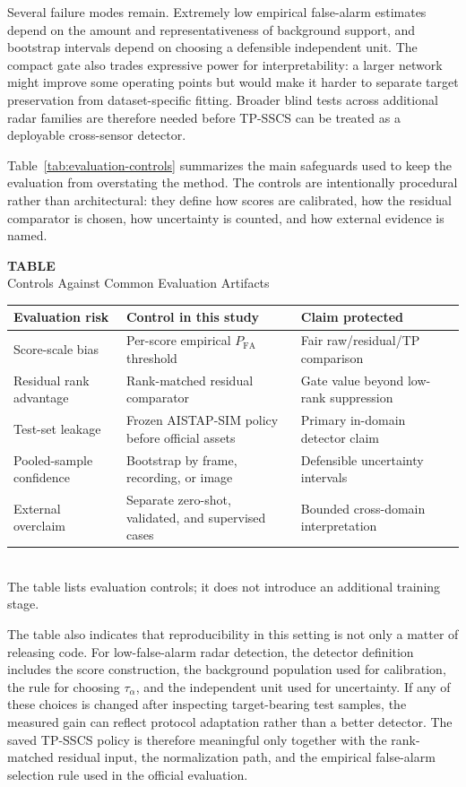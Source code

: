 \documentclass[journal]{IEEEtran}
\newcommand{\SingleColumnTableBlock}[3]{%
  \begin{center}
  \begin{minipage}{\columnwidth}
  \centering
  \refstepcounter{table}\label{#1}%
  {\footnotesize\textbf{TABLE~\thetable}}\\[-0.2em]
  {\scriptsize #2}\\[0.35em]
  #3%
  \end{minipage}
  \end{center}
  \vspace{-0.05em}
}
\begin{document}
Several failure modes remain. Extremely low empirical false-alarm estimates depend on the amount and representativeness of background support, and bootstrap intervals depend on choosing a defensible independent unit. The compact gate also trades expressive power for interpretability: a larger network might improve some operating points but would make it harder to separate target preservation from dataset-specific fitting. Broader blind tests across additional radar families are therefore needed before TP-SSCS can be treated as a deployable cross-sensor detector.

Table~\ref{tab:evaluation-controls} summarizes the main safeguards used to keep the evaluation from overstating the method. The controls are intentionally procedural rather than architectural: they define how scores are calibrated, how the residual comparator is chosen, how uncertainty is counted, and how external evidence is named.

\SingleColumnTableBlock{tab:evaluation-controls}{Controls Against Common Evaluation Artifacts}
{{\scriptsize
\setlength{\tabcolsep}{2.5pt}
\renewcommand{\arraystretch}{1.08}
\begin{tabular}{@{}p{0.25\columnwidth}p{0.38\columnwidth}p{0.27\columnwidth}@{}}
\toprule
Evaluation risk & Control in this study & Claim protected \\
\midrule
Score-scale bias & Per-score empirical $P_{\mathrm{FA}}$ threshold & Fair raw/residual/TP comparison \\
Residual rank advantage & Rank-matched residual comparator & Gate value beyond low-rank suppression \\
Test-set leakage & Frozen AISTAP-SIM policy before official assets & Primary in-domain detector claim \\
Pooled-sample confidence & Bootstrap by frame, recording, or image & Defensible uncertainty intervals \\
External overclaim & Separate zero-shot, validated, and supervised cases & Bounded cross-domain interpretation \\
\bottomrule
\end{tabular}\\[0.1em]
\scriptsize The table lists evaluation controls; it does not introduce an additional training stage.
}}

The table also indicates that reproducibility in this setting is not only a matter of releasing code. For low-false-alarm radar detection, the detector definition includes the score construction, the background population used for calibration, the rule for choosing $\tau_\alpha$, and the independent unit used for uncertainty. If any of these choices is changed after inspecting target-bearing test samples, the measured gain can reflect protocol adaptation rather than a better detector. The saved TP-SSCS policy is therefore meaningful only together with the rank-matched residual input, the normalization path, and the empirical false-alarm selection rule used in the official evaluation.
\end{document}
